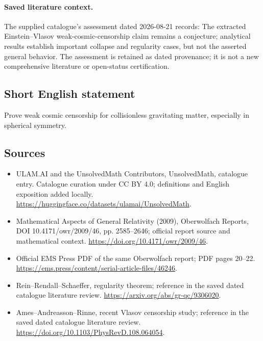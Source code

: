 \documentclass[11pt]{article}
\begin{document}
\paragraph{Saved literature context.} The supplied catalogue's assessment dated 2026-08-21 records: The extracted Einstein--Vlasov weak-cosmic-censorship claim remains a conjecture; analytical results establish important collapse and regularity cases, but not the asserted general behavior. The assessment is retained as dated provenance; it is not a new comprehensive literature or open-status certification.
\subsection{Short English statement}
Prove weak cosmic censorship for collisionless gravitating matter, especially in spherical symmetry.
\subsection{Sources}
\begin{itemize}
\item[\hypertarget{source:statement:1}{S1}] ULAM.AI and the UnsolvedMath Contributors, UnsolvedMath, catalogue entry. Catalogue curation under CC BY 4.0; definitions and English exposition added locally.
\url{https://huggingface.co/datasets/ulamai/UnsolvedMath}.
\item[\hypertarget{source:statement:2}{S2}] Mathematical Aspects of General Relativity (2009), Oberwolfach Reports, DOI 10.4171/owr/2009/46, pp. 2585--2646; official report source and mathematical context.
\url{https://doi.org/10.4171/owr/2009/46}.
\item[\hypertarget{source:statement:3}{S3}] Official EMS Press PDF of the same Oberwolfach report; PDF pages 20--22.
\url{https://ems.press/content/serial-article-files/46246}.
\item[\hypertarget{source:statement:4}{S4}] Rein--Rendall--Schaeffer, regularity theorem; reference in the saved dated catalogue literature review.
\url{https://arxiv.org/abs/gr-qc/9306020}.
\item[\hypertarget{source:statement:5}{S5}] Ames--Andreasson--Rinne, recent Vlasov censorship study; reference in the saved dated catalogue literature review.
\url{https://doi.org/10.1103/PhysRevD.108.064054}.
\end{itemize}
\label{end:statement}
\end{document}
